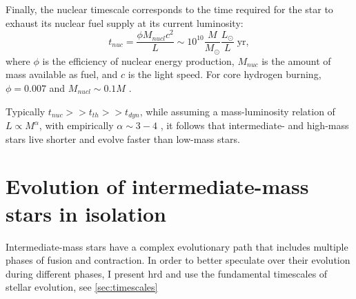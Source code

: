Finally, the nuclear timescale corresponds to the time required for the star to exhaust its nuclear fuel supply at its current luminosity: 
\begin{equation}\label{eq:nuclear_timsecale}
    t_{nuc} = \frac{\phi M_{nucl} c^2}{L} \sim 10^{10} \frac{M}{M_{\odot}} \frac{L_{\odot}}{L} \; \text{yr},
\end{equation}
where $\phi$ is the efficiency of nuclear energy production, $M_{nuc}$ is the amount of mass available as fuel, and $c$ is the light speed. For core hydrogen burning, $\phi = 0.007$ and $M_{nucl} \sim 0.1 M$ \citep{pols2011stellar}.

Typically $t_{nuc} >> t_{th} >> t_{dyn}$, while assuming a mass-luminosity relation of $L \propto M^{\alpha}$, with empirically $\alpha \sim 3-4$ \citep{eker2015main}, it follows that intermediate- and high-mass stars live shorter and evolve faster than low-mass stars.


\section{Evolution of intermediate-mass stars in isolation}\label{sec:single_star_evolution}

Intermediate-mass stars have a complex evolutionary path that includes multiple phases of fusion and contraction. In order to better speculate over their evolution during different phases, I present \ac{hrd} and use the fundamental timescales of stellar evolution, see \cref{sec:timescales}


